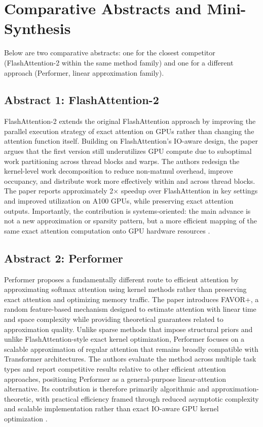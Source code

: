 \documentclass[12pt, a4paper]{article}
\begin{document}
\section{Comparative Abstracts and Mini-Synthesis}

Below are two comparative abstracts: one for the closest competitor (FlashAttention-2 within the same method family) and one for a different approach (Performer, linear approximation family).

\subsection{Abstract 1: FlashAttention-2}

FlashAttention-2 extends the original FlashAttention approach by improving the parallel execution strategy of exact attention on GPUs rather than changing the attention function itself. Building on FlashAttention's IO-aware design, the paper argues that the first version still underutilizes GPU compute due to suboptimal work partitioning across thread blocks and warps. The authors redesign the kernel-level work decomposition to reduce non-matmul overhead, improve occupancy, and distribute work more effectively within and across thread blocks. The paper reports approximately 2$\times$ speedup over FlashAttention in key settings and improved utilization on A100 GPUs, while preserving exact attention outputs. Importantly, the contribution is systems-oriented: the main advance is not a new approximation or sparsity pattern, but a more efficient mapping of the same exact attention computation onto GPU hardware resources \parencite{dao2023flashattention2fasterattentionbetter}.

\subsection{Abstract 2: Performer}

Performer proposes a fundamentally different route to efficient attention by approximating softmax attention using kernel methods rather than preserving exact attention and optimizing memory traffic. The paper introduces FAVOR+, a random feature-based mechanism designed to estimate attention with linear time and space complexity while providing theoretical guarantees related to approximation quality. Unlike sparse methods that impose structural priors and unlike FlashAttention-style exact kernel optimization, Performer focuses on a scalable approximation of regular attention that remains broadly compatible with Transformer architectures. The authors evaluate the method across multiple task types and report competitive results relative to other efficient attention approaches, positioning Performer as a general-purpose linear-attention alternative. Its contribution is therefore primarily algorithmic and approximation-theoretic, with practical efficiency framed through reduced asymptotic complexity and scalable implementation rather than exact IO-aware GPU kernel optimization \parencite{choromanski2022rethinkingattentionperformers}.
\end{document}
